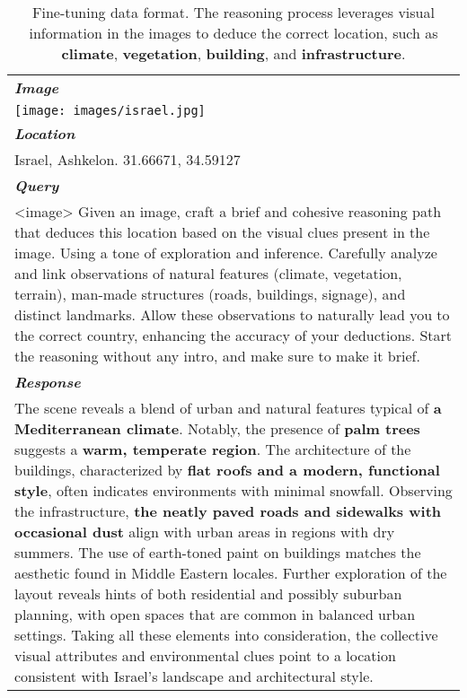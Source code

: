 \begin{table}[t!]
    \centering
    \small
    \begin{tabularx}{\linewidth}{Y}
    \toprule 
        \textit{\textbf{Image}} \\
        \texttt{[image: images/israel.jpg]} \\
        \midrule
        \textit{\textbf{Location}} \\
        Israel, Ashkelon. 31.66671, 34.59127 \\
        \midrule
        \textit{\textbf{Query}} \\
        <image> Given an image, craft a brief and cohesive reasoning path that deduces this location based on the visual clues present in the image. Using a tone of exploration and inference. Carefully analyze and link observations of natural features (climate, vegetation, terrain), man-made structures (roads, buildings, signage), and distinct landmarks. Allow these observations to naturally lead you to the correct country, enhancing the accuracy of your deductions. Start the reasoning without any intro, and make sure to make it brief. \\
        \midrule
        \textit{\textbf{Response}} \\
        The scene reveals a blend of urban and natural features typical of \textcolor{climate}{\textbf{a Mediterranean climate}}. Notably, the presence of \textcolor{vegetation}{\textbf{palm trees}} suggests a \textcolor{climate}{\textbf{warm, temperate region}}. The architecture of the buildings, characterized by \textcolor{building}{\textbf{flat roofs and a modern, functional style}}, often indicates environments with minimal snowfall. Observing the infrastructure, \textcolor{infrastructure}{\textbf{the neatly paved roads and sidewalks with occasional dust}} align with urban areas in regions with dry summers. The use of earth-toned paint on buildings matches the aesthetic found in Middle Eastern locales. Further exploration of the layout reveals hints of both residential and possibly suburban planning, with open spaces that are common in balanced urban settings. Taking all these elements into consideration, the collective visual attributes and environmental clues point to a location consistent with Israel's landscape and architectural style.\\
    \bottomrule
    \end{tabularx}
    \caption{Fine-tuning data format. The reasoning process leverages visual information in the images to deduce the correct location, such as \textcolor{climate}{\textbf{climate}}, \textcolor{vegetation}{\textbf{vegetation}}, \textcolor{building}{\textbf{building}}, and \textcolor{infrastructure}{\textbf{infrastructure}}.}
    \label{tab:sft_data_full}
\end{table}


